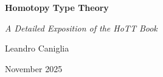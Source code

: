 \documentclass[openany]{book}
\author{Leandro Caniglia}
\date{November 2025}
\begin{document}
\begin{titlepage}
    \centering
    \vfill %
    
    {\fontsize{33}{40}\selectfont \bfseries Homotopy Type Theory\par}
    \vspace{0.6cm}
    
    {\fontsize{19}{24}\selectfont \slshape A Detailed Exposition of the HoTT Book\par}
    \vspace{2.5cm}
    
    {\Large Leandro Caniglia\par}
    \vspace{0.3cm}
    
    {\large November 2025\par}
    
    \vfill %
\end{titlepage}
\let\cleardoublepage\clearpage
\frontmatter
{}
{}
\tableofcontents
\mainmatter
\setlength{\parindent}{0pt}






\appendix


\backmatter


\end{document}
